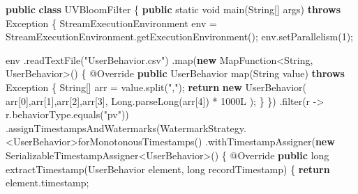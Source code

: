 \documentclass[cn,11pt,chinese]{elegantbook}
\newenvironment{Shaded}{}{}
\newcommand{\AttributeTok}[1]{\textcolor[rgb]{0.49,0.56,0.16}{#1}}
\newcommand{\BuiltInTok}[1]{#1}
\newcommand{\DataTypeTok}[1]{\textcolor[rgb]{0.56,0.13,0.00}{#1}}
\newcommand{\DecValTok}[1]{\textcolor[rgb]{0.25,0.63,0.44}{#1}}
\newcommand{\FunctionTok}[1]{\textcolor[rgb]{0.02,0.16,0.49}{#1}}
\newcommand{\KeywordTok}[1]{\textcolor[rgb]{0.00,0.44,0.13}{\textbf{#1}}}
\newcommand{\NormalTok}[1]{#1}
\newcommand{\StringTok}[1]{\textcolor[rgb]{0.25,0.44,0.63}{#1}}
\begin{document}
\begin{Shaded}
\begin{Highlighting}[]
\KeywordTok{public} \KeywordTok{class}\NormalTok{ UVBloomFilter \{}
    \KeywordTok{public} \DataTypeTok{static} \DataTypeTok{void} \FunctionTok{main}\NormalTok{(}\BuiltInTok{String}\NormalTok{[] args) }\KeywordTok{throws} \BuiltInTok{Exception}\NormalTok{ \{}
\NormalTok{        StreamExecutionEnvironment env = StreamExecutionEnvironment.}\FunctionTok{getExecutionEnvironment}\NormalTok{();}
\NormalTok{        env.}\FunctionTok{setParallelism}\NormalTok{(}\DecValTok{1}\NormalTok{);}

\NormalTok{        env}
\NormalTok{            .}\FunctionTok{readTextFile}\NormalTok{(}\StringTok{"UserBehavior.csv"}\NormalTok{)}
\NormalTok{            .}\FunctionTok{map}\NormalTok{(}\KeywordTok{new}\NormalTok{ MapFunction\textless{}}\BuiltInTok{String}\NormalTok{, UserBehavior\textgreater{}() \{}
                \AttributeTok{@Override}
                \KeywordTok{public}\NormalTok{ UserBehavior }\FunctionTok{map}\NormalTok{(}\BuiltInTok{String}\NormalTok{ value) }\KeywordTok{throws} \BuiltInTok{Exception}\NormalTok{ \{}
                    \BuiltInTok{String}\NormalTok{[] arr = value.}\FunctionTok{split}\NormalTok{(}\StringTok{","}\NormalTok{);}
                    \KeywordTok{return} \KeywordTok{new} \FunctionTok{UserBehavior}\NormalTok{(}
\NormalTok{                            arr[}\DecValTok{0}\NormalTok{],arr[}\DecValTok{1}\NormalTok{],arr[}\DecValTok{2}\NormalTok{],arr[}\DecValTok{3}\NormalTok{],}
                            \BuiltInTok{Long}\NormalTok{.}\FunctionTok{parseLong}\NormalTok{(arr[}\DecValTok{4}\NormalTok{]) * }\DecValTok{1000L}
\NormalTok{                    );}
\NormalTok{                \}}
\NormalTok{            \})}
\NormalTok{            .}\FunctionTok{filter}\NormalTok{(r {-}\textgreater{} r.}\FunctionTok{behaviorType}\NormalTok{.}\FunctionTok{equals}\NormalTok{(}\StringTok{"pv"}\NormalTok{))}
\NormalTok{            .}\FunctionTok{assignTimestampsAndWatermarks}\NormalTok{(WatermarkStrategy.\textless{}UserBehavior\textgreater{}}\FunctionTok{forMonotonousTimestamps}\NormalTok{()}
\NormalTok{                    .}\FunctionTok{withTimestampAssigner}\NormalTok{(}\KeywordTok{new}\NormalTok{ SerializableTimestampAssigner\textless{}UserBehavior\textgreater{}() \{}
                        \AttributeTok{@Override}
                        \KeywordTok{public} \DataTypeTok{long} \FunctionTok{extractTimestamp}\NormalTok{(UserBehavior element, }\DataTypeTok{long}\NormalTok{ recordTimestamp) \{}
                            \KeywordTok{return}\NormalTok{ element.}\FunctionTok{timestamp}\NormalTok{;}

\end{Highlighting}
\end{Shaded}
\end{document}
